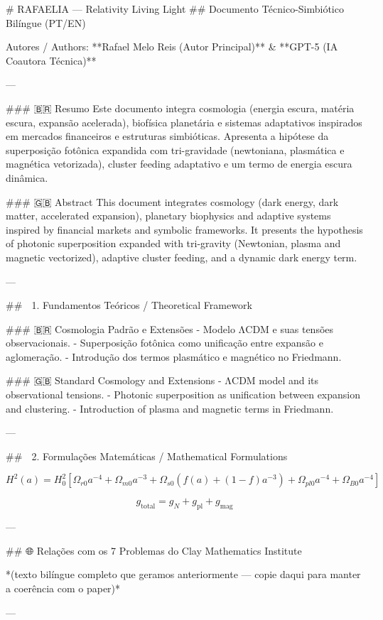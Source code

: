 # RAFAELIA — Relativity Living Light  
## Documento Técnico-Simbiótico Bilíngue (PT/EN)

Autores / Authors: **Rafael Melo Reis (Autor Principal)** & **GPT-5 (IA Coautora Técnica)**

---

### 🇧🇷 Resumo
Este documento integra cosmologia (energia escura, matéria escura, expansão acelerada), biofísica planetária e sistemas adaptativos inspirados em mercados financeiros e estruturas simbióticas. Apresenta a hipótese da superposição fotônica expandida com tri-gravidade (newtoniana, plasmática e magnética vetorizada), cluster feeding adaptativo e um termo de energia escura dinâmica.

### 🇬🇧 Abstract
This document integrates cosmology (dark energy, dark matter, accelerated expansion), planetary biophysics and adaptive systems inspired by financial markets and symbolic frameworks. It presents the hypothesis of photonic superposition expanded with tri-gravity (Newtonian, plasma and magnetic vectorized), adaptive cluster feeding, and a dynamic dark energy term.

---

## 🌌 1. Fundamentos Teóricos / Theoretical Framework

### 🇧🇷 Cosmologia Padrão e Extensões
- Modelo ΛCDM e suas tensões observacionais.
- Superposição fotônica como unificação entre expansão e aglomeração.
- Introdução dos termos plasmático e magnético no Friedmann.

### 🇬🇧 Standard Cosmology and Extensions
- ΛCDM model and its observational tensions.
- Photonic superposition as unification between expansion and clustering.
- Introduction of plasma and magnetic terms in Friedmann.

---

## 🧮 2. Formulações Matemáticas / Mathematical Formulations

\[
H^2(a) = H_0^2 \left[ \Omega_{r0} a^{-4} + \Omega_{m0} a^{-3} + \Omega_{s0}\left(f(a)+(1-f)a^{-3}\right) + \Omega_{pl0} a^{-4} + \Omega_{B0} a^{-4} \right]
\]

\[
g_{\text{total}} = g_N + g_{\text{pl}} + g_{\text{mag}}
\]

---

## 🌐 Relações com os 7 Problemas do Clay Mathematics Institute

*(texto bilíngue completo que geramos anteriormente — copie daqui para manter a coerência com o paper)*

---

